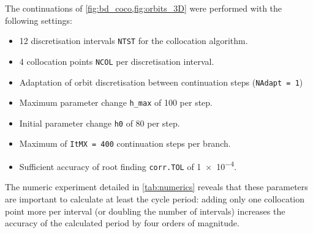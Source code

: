 \begin{figure}
\label{fig:bridge_phase}
\end{figure}


\begin{figure}
\label{fig:bd_coco}
\end{figure}


\begin{figure}
\label{fig:orbits_3D}
\end{figure}


The continuations of \cref{fig:bd_coco,fig:orbits_3D} were performed with the following settings:
\begin{itemize}
\item 12 discretisation intervals \texttt{NTST} for the collocation algorithm.
\item 4 collocation points \texttt{NCOL} per discretisation interval.
\item Adaptation of orbit discretisation between continuation steps (\texttt{NAdapt = 1})
\item Maximum parameter change \texttt{h\_max} of 100 per step.
\item Initial parameter change \texttt{h0} of 80 per step.
\item Maximum of \texttt{ItMX = 400} continuation steps per branch.
\item Sufficient accuracy of root finding \texttt{corr.TOL} of \num{1e-4}.
\end{itemize}

The numeric experiment detailed in \cref{tab:numerics} reveals that these parameters are important to calculate at least the cycle period: adding only one collocation point more per interval (or doubling the number of intervals) increases the accuracy of the calculated period by four orders of magnitude.


